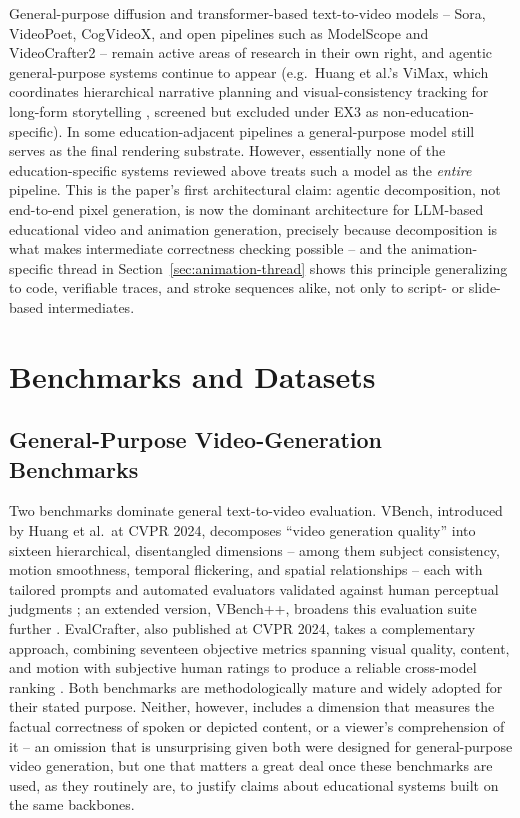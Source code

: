 \documentclass[journal]{IEEEtran}
\begin{document}
General-purpose diffusion and transformer-based text-to-video models -- Sora, VideoPoet, CogVideoX, and open pipelines such as ModelScope and VideoCrafter2 -- remain active areas of research in their own right, and agentic general-purpose systems continue to appear (e.g.\ Huang et al.'s ViMax, which coordinates hierarchical narrative planning and visual-consistency tracking for long-form storytelling \cite{huang2026vimax}, screened but excluded under EX3 as non-education-specific). In some education-adjacent pipelines a general-purpose model still serves as the final rendering substrate. However, essentially none of the education-specific systems reviewed above treats such a model as the \emph{entire} pipeline. This is the paper's first architectural claim: agentic decomposition, not end-to-end pixel generation, is now the dominant architecture for LLM-based educational video and animation generation, precisely because decomposition is what makes intermediate correctness checking possible -- and the animation-specific thread in Section~\ref{sec:animation-thread} shows this principle generalizing to code, verifiable traces, and stroke sequences alike, not only to script- or slide-based intermediates.

\section{Benchmarks and Datasets}
\label{sec:benchmarks}

\subsection{General-Purpose Video-Generation Benchmarks}

Two benchmarks dominate general text-to-video evaluation. VBench, introduced by Huang et al.\ at CVPR 2024, decomposes ``video generation quality'' into sixteen hierarchical, disentangled dimensions -- among them subject consistency, motion smoothness, temporal flickering, and spatial relationships -- each with tailored prompts and automated evaluators validated against human perceptual judgments \cite{huang2024vbench}; an extended version, VBench++, broadens this evaluation suite further \cite{huang2024vbenchpp}. EvalCrafter, also published at CVPR 2024, takes a complementary approach, combining seventeen objective metrics spanning visual quality, content, and motion with subjective human ratings to produce a reliable cross-model ranking \cite{liu2024evalcrafter}. Both benchmarks are methodologically mature and widely adopted for their stated purpose. Neither, however, includes a dimension that measures the factual correctness of spoken or depicted content, or a viewer's comprehension of it -- an omission that is unsurprising given both were designed for general-purpose video generation, but one that matters a great deal once these benchmarks are used, as they routinely are, to justify claims about educational systems built on the same backbones.
\end{document}
